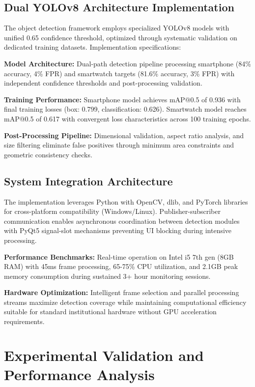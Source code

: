 \documentclass[conference]{IEEEtran}
\begin{document}
\subsection{Dual YOLOv8 Architecture Implementation}

The object detection framework employs specialized YOLOv8 models with unified 0.65 confidence threshold, optimized through systematic validation on dedicated training datasets. Implementation specifications:

\textbf{Model Architecture:} Dual-path detection pipeline processing smartphone (84\% accuracy, 4\% FPR) and smartwatch targets (81.6\% accuracy, 3\% FPR) with independent confidence thresholds and post-processing validation.

\textbf{Training Performance:} Smartphone model achieves mAP@0.5 of 0.936 with final training losses (box: 0.799, classification: 0.626). Smartwatch model reaches mAP@0.5 of 0.617 with convergent loss characteristics across 100 training epochs.

\textbf{Post-Processing Pipeline:} Dimensional validation, aspect ratio analysis, and size filtering eliminate false positives through minimum area constraints and geometric consistency checks.

\subsection{System Integration Architecture}

The implementation leverages Python with OpenCV, dlib, and PyTorch libraries for cross-platform compatibility (Windows/Linux). Publisher-subscriber communication enables asynchronous coordination between detection modules with PyQt5 signal-slot mechanisms preventing UI blocking during intensive processing.

\textbf{Performance Benchmarks:} Real-time operation on Intel i5 7th gen (8GB RAM) with 45ms frame processing, 65-75\% CPU utilization, and 2.1GB peak memory consumption during sustained 3+ hour monitoring sessions.

\textbf{Hardware Optimization:} Intelligent frame selection and parallel processing streams maximize detection coverage while maintaining computational efficiency suitable for standard institutional hardware without GPU acceleration requirements.

\section{Experimental Validation and Performance Analysis}
\end{document}
